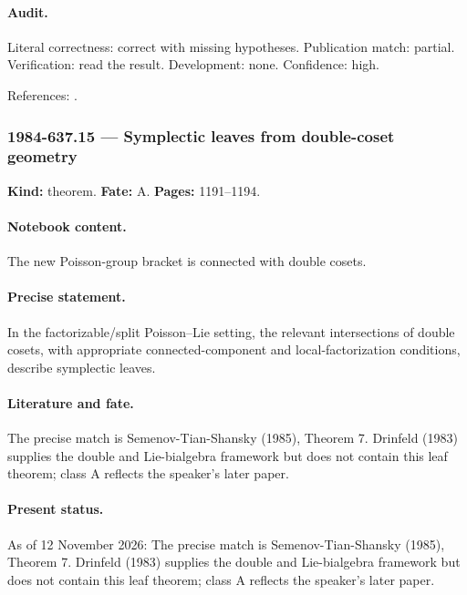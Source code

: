\paragraph{Audit.} Literal correctness: correct with missing hypotheses. Publication match: partial. Verification: read the result. Development: none. Confidence: high.

\noindent References: \citep{semenov1983classical}.\par

\subsubsection{1984-637.15 --- Symplectic leaves from double-coset geometry}

\label{item:1984-637.15}

\noindent\textbf{Kind:} theorem. \textbf{Fate:} A. \textbf{Pages:} 1191--1194.\par

\paragraph{Notebook content.} The new Poisson-group bracket is connected with double cosets.

\paragraph{Precise statement.} In the factorizable/split Poisson--Lie setting, the relevant intersections of double cosets, with appropriate connected-component and local-factorization conditions, describe symplectic leaves.

\paragraph{Literature and fate.} The precise match is Semenov-Tian-Shansky (1985), Theorem 7. Drinfeld (1983) supplies the double and Lie-bialgebra framework but does not contain this leaf theorem; class A reflects the speaker's later paper.

\paragraph{Present status.} As of 12 November 2026: The precise match is Semenov-Tian-Shansky (1985), Theorem 7. Drinfeld (1983) supplies the double and Lie-bialgebra framework but does not contain this leaf theorem; class A reflects the speaker's later paper.

